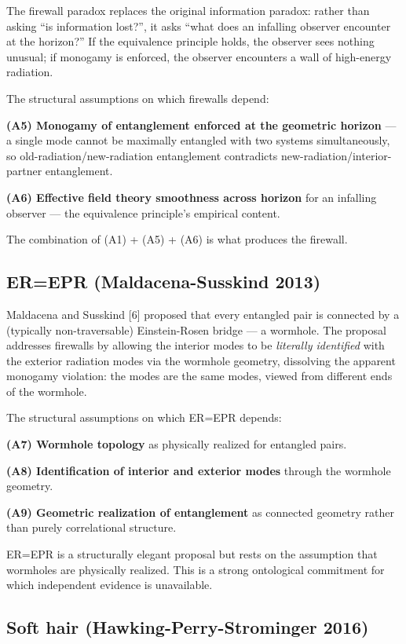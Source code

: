 \documentclass[11pt,a4paper]{article}
\begin{document}
The firewall paradox replaces the original information paradox: rather than asking ``is information lost?'', it asks ``what does an infalling observer encounter at the horizon?'' If the equivalence principle holds, the observer sees nothing unusual; if monogamy is enforced, the observer encounters a wall of high-energy radiation.

The structural assumptions on which firewalls depend:

\textbf{(A5) Monogamy of entanglement enforced at the geometric horizon} --- a single mode cannot be maximally entangled with two systems simultaneously, so old-radiation/new-radiation entanglement contradicts new-radiation/interior-partner entanglement.

\textbf{(A6) Effective field theory smoothness across horizon} for an infalling observer --- the equivalence principle's empirical content.

The combination of (A1) + (A5) + (A6) is what produces the firewall.

\subsection{ER=EPR (Maldacena-Susskind 2013)}

Maldacena and Susskind [6] proposed that every entangled pair is connected by a (typically non-traversable) Einstein-Rosen bridge --- a wormhole. The proposal addresses firewalls by allowing the interior modes to be \emph{literally identified} with the exterior radiation modes via the wormhole geometry, dissolving the apparent monogamy violation: the modes are the same modes, viewed from different ends of the wormhole.

The structural assumptions on which ER=EPR depends:

\textbf{(A7) Wormhole topology} as physically realized for entangled pairs.

\textbf{(A8) Identification of interior and exterior modes} through the wormhole geometry.

\textbf{(A9) Geometric realization of entanglement} as connected geometry rather than purely correlational structure.

ER=EPR is a structurally elegant proposal but rests on the assumption that wormholes are physically realized. This is a strong ontological commitment for which independent evidence is unavailable.

\subsection{Soft hair (Hawking-Perry-Strominger 2016)}
\end{document}

